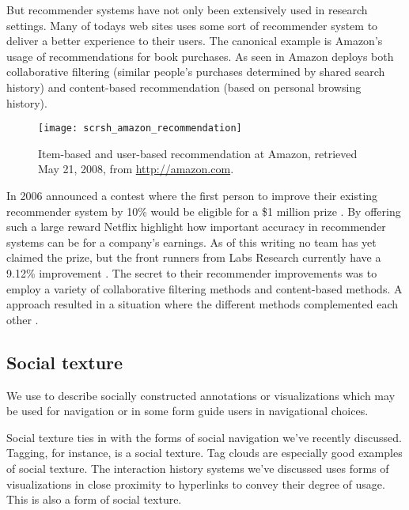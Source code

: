 But recommender systems have not only been extensively used in research
settings. Many of todays web sites uses some sort of recommender system to
deliver a better experience to their users. The canonical example is Amazon's%
usage of recommendations for book purchases. As seen in
Amazon deploys both collaborative filtering (similar people's purchases
determined by shared search history) and content-based recommendation (based
on personal browsing history).

\begin{figure}
  \texttt{[image: scrsh\_amazon\_recommendation]}
  \caption[Recommendations at Amazon]{
    Item-based and user-based recommendation at Amazon,
    retrieved May 21, 2008, from
    \url{http://amazon.com}.
  }
  \label{figure:scrsh.amazon.recommendation}
\end{figure}

In 2006 %
announced a contest where the first person to improve their existing
recommender system by 10\% would be eligible for a \$1 million prize
\citep[]{segaran07}. By offering such a large reward Netflix
highlight how important accuracy in recommender systems can be for a company's
earnings. As of this writing no team has yet claimed the prize, but the front
runners from  Labs Research currently have a 9.12\% improvement
\citep{netflix08}. The secret to their recommender improvements was to employ
a variety of collaborative filtering methods and content-based methods.
A approach resulted in a situation where the different methods
complemented each other \citep[]{bell07}.

\subsection{Social texture}

We use  to describe socially constructed annotations or
visualizations which may be used for navigation or in some form guide
users in navigational choices.

Social texture ties in with the forms of social navigation we've
recently discussed. Tagging, for instance, is a social texture. Tag clouds are
especially good examples of social texture.
The interaction history systems we've discussed uses forms of visualizations
in close proximity to hyperlinks to convey their degree of usage. This is also
a form of social texture.

